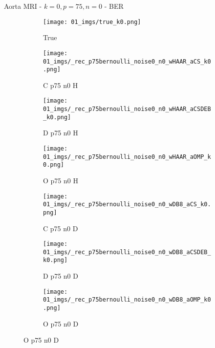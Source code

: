 \begin{frame}{Aorta MRI - $k=0,p=75,n=0$ - BER}{}
\begin{figure}
\begin{subfigure}{0.13\textwidth}
\texttt{[image: 01\_imgs/true\_k0.png]}
\caption*{\tiny True}
\end{subfigure}
\begin{subfigure}{0.13\textwidth}
\texttt{[image: 01\_imgs/\_rec\_p75bernoulli\_noise0\_n0\_wHAAR\_aCS\_k0.png]}
\caption*{\tiny C p75 n0 H}
\end{subfigure}
\begin{subfigure}{0.13\textwidth}
\texttt{[image: 01\_imgs/\_rec\_p75bernoulli\_noise0\_n0\_wHAAR\_aCSDEB\_k0.png]}
\caption*{\tiny D p75 n0 H}
\end{subfigure}
\begin{subfigure}{0.13\textwidth}
\texttt{[image: 01\_imgs/\_rec\_p75bernoulli\_noise0\_n0\_wHAAR\_aOMP\_k0.png]}
\caption*{\tiny O p75 n0 H}
\end{subfigure}
\begin{subfigure}{0.13\textwidth}
\texttt{[image: 01\_imgs/\_rec\_p75bernoulli\_noise0\_n0\_wDB8\_aCS\_k0.png]}
\caption*{\tiny C p75 n0 D}
\end{subfigure}
\begin{subfigure}{0.13\textwidth}
\texttt{[image: 01\_imgs/\_rec\_p75bernoulli\_noise0\_n0\_wDB8\_aCSDEB\_k0.png]}
\caption*{\tiny D p75 n0 D}
\end{subfigure}
\begin{subfigure}{0.13\textwidth}
\texttt{[image: 01\_imgs/\_rec\_p75bernoulli\_noise0\_n0\_wDB8\_aOMP\_k0.png]}
\caption*{\tiny O p75 n0 D}
\end{subfigure}

\vspace{5pt}


\end{figure}
\end{frame}
